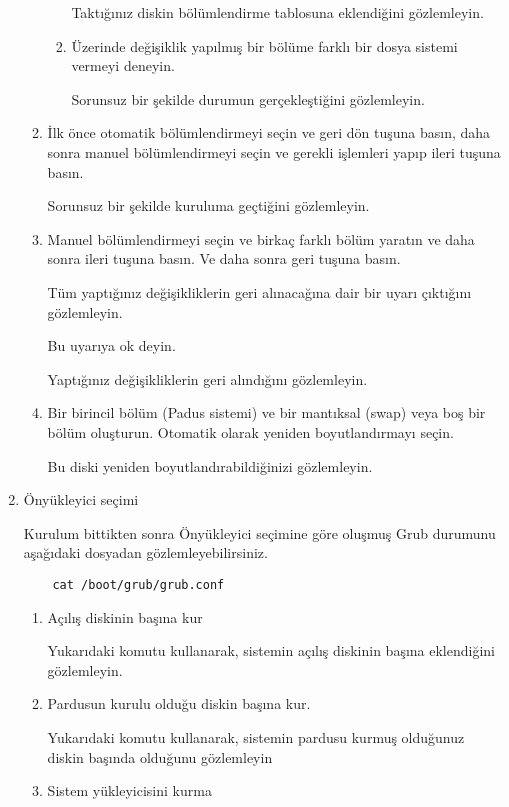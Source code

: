 \documentclass[a4paper,10pt]{article}
\begin{document}
\begin{enumerate}
\begin{enumerate}
\begin{enumerate}
		Taktığınız diskin bölümlendirme tablosuna eklendiğini gözlemleyin.

            \item Üzerinde değişiklik yapılmış bir bölüme farklı bir dosya sistemi vermeyi deneyin.

		Sorunsuz bir şekilde durumun gerçekleştiğini gözlemleyin.
        \end{enumerate}
        \item İlk önce otomatik bölümlendirmeyi seçin ve geri dön tuşuna basın, daha sonra manuel bölümlendirmeyi seçin ve gerekli işlemleri yapıp ileri tuşuna basın.

	Sorunsuz bir şekilde kuruluma geçtiğini gözlemleyin.
	\item Manuel bölümlendirmeyi seçin ve birkaç farklı bölüm yaratın ve daha sonra ileri tuşuna basın. Ve daha sonra geri tuşuna basın.

	Tüm yaptığınız değişikliklerin geri alınacağına dair bir uyarı çıktığını gözlemleyin. 

	Bu uyarıya ok deyin. 
		
	Yaptığınız değişikliklerin geri alındığını gözlemleyin.
	 
        \item Bir birincil bölüm (Padus sistemi) ve bir mantıksal (swap) veya boş bir bölüm oluşturun. Otomatik olarak yeniden boyutlandırmayı seçin.

	Bu diski yeniden boyutlandırabildiğinizi gözlemleyin.
    \end{enumerate}
\item Önyükleyici seçimi

Kurulum bittikten sonra Önyükleyici seçimine göre oluşmuş Grub durumunu aşağıdaki dosyadan gözlemleyebilirsiniz. 
   \begin{verbatim}
    cat /boot/grub/grub.conf 
   \end{verbatim}


   \begin{enumerate}
     \item Açılış diskinin başına kur

	Yukarıdaki komutu kullanarak, sistemin açılış diskinin başına eklendiğini gözlemleyin.
    \item Pardusun kurulu olduğu diskin başına kur.

	Yukarıdaki komutu kullanarak, sistemin pardusu kurmuş olduğunuz diskin başında olduğunu gözlemleyin
    \item Sistem yükleyicisini kurma


\end{enumerate}
\end{enumerate}
\end{document}
